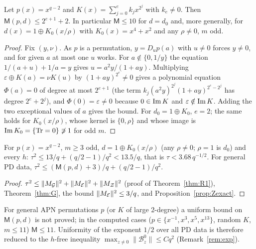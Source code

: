 \begin{proposition}\label{prop:Minv}
Let $p(x)=x^{q-2}$ and $K(x)=\sum_{j=0}^ek_jx^{2^j}$ with $k_e\ne0$. Then $\mathsf M(p,d)\le2^{e+1}+2$. In particular
$\mathsf M\le10$ for $d=d_0$ and, more generally, for $d(x)=1\oplus K_0(x/\rho)$ with $K_0(x)=x^4+x^2$ and any $\rho\ne0$, $m$ odd.
\end{proposition}
\begin{proof}
Fix $(y,\nu)$. As $p$ is a permutation, $y=D_up(a)$ with $u\ne0$ forces $y\ne0$, and for given $a$ at most one $u$ works. For $a\notin\{0,1/y\}$
the equation $1/(a+u)+1/a=y$ gives $u=a^2y/(1+ay)$. Multiplying $\varepsilon\oplus K(a)=\nu K(u)$ by $(1+ay)^{2^e}\ne0$ gives a polynomial
equation $\Phi(a)=0$ of degree at most $2^{e+1}$ (the term $k_j(a^2y)^{2^j}(1+ay)^{2^e-2^j}$ has degree $2^e+2^j$), and $\Phi(0)=\varepsilon\ne0$
because $0\in\mathrm{Im}\, K$ and $\varepsilon\notin\mathrm{Im}\, K$. Adding the two exceptional values of $a$ gives the bound. For $d_0=1\oplus K_0$, $e=2$; the
same holds for $K_0(x/\rho)$, whose kernel is $\{0,\rho\}$ and whose image is $\mathrm{Im}\, K_0=\{\mathrm{Tr}=0\}\not\ni1$ for odd $m$.
\end{proof}

\begin{corollary}[Exponent $1/2$ for the inverse map with $d=1\oplus K_0(x/\rho)$]\label{cor:half}
For $p(x)=x^{q-2}$, $m\ge3$ odd, $d=1\oplus K_0(x/\rho)$ (any $\rho\ne0$; $\rho=1$ is $d_0$) and every $h$:
$\tau^2\le13/q+(q/2-1)/q^2<13.5/q$, that is $\tau<3.68\,q^{-1/2}$. For general PD data,
$\tau^2\le(\mathsf M(p,d)+3)/q+(q/2-1)/q^2$.
\end{corollary}
\begin{proof}
$\tau^2\le\|M_{\mathcal{G}}\|^2+\|M_{\mathcal{E}}\|^2+\|M_{\mathcal{Z}}\|^2$ (proof of Theorem~\ref{thm:R1}), Theorem~\ref{thm:G}, the bound $\|M_{\mathcal{E}}\|^2\le3/q$, and
Proposition~\ref{prop:Zexact}.
\end{proof}
For general APN permutations $p$ (or $K$ of large $2$-degree) a uniform bound on $\mathsf M(p,d)$ is not proved; in the computed cases
($p\in\{x^{-1},x^3,x^5,x^{13}\}$, random $K$, $m\le11$) $\mathsf M\le11$. Uniformity of the exponent $1/2$ over all PD data is therefore
reduced to the $h$-free inequality $\max_{z\ne0}\|\mathcal B^0_z\|\le Cq^2$ (Remark~\ref{rem:exp}).

